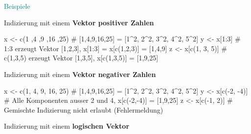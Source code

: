 \documentclass[
  8pt,
  ignorenonframetext,
]{beamer}
\newenvironment{Shaded}{\begin{snugshade}}{\end{snugshade}}
\newcommand{\CommentTok}[1]{\textcolor[rgb]{0.37,0.37,0.37}{#1}}
\newcommand{\DecValTok}[1]{\textcolor[rgb]{0.68,0.00,0.00}{#1}}
\newcommand{\FunctionTok}[1]{\textcolor[rgb]{0.28,0.35,0.67}{#1}}
\newcommand{\NormalTok}[1]{\textcolor[rgb]{0.00,0.23,0.31}{#1}}
\newcommand{\OtherTok}[1]{\textcolor[rgb]{0.00,0.23,0.31}{#1}}
\newcommand{\SpecialCharTok}[1]{\textcolor[rgb]{0.37,0.37,0.37}{#1}}
\begin{document}
\begin{frame}[fragile]{\textcolor{darkcyan}{Beispiele}}
\protect\hypertarget{section}{}
\footnotesize

Indizierung mit einem \textbf{Vektor positiver Zahlen}

\begin{Shaded}
\begin{Highlighting}[]
\NormalTok{x }\OtherTok{\textless{}{-}} \FunctionTok{c}\NormalTok{(}\DecValTok{1}\NormalTok{ ,}\DecValTok{4}\NormalTok{ ,}\DecValTok{9}\NormalTok{ ,}\DecValTok{16}\NormalTok{ ,}\DecValTok{25}\NormalTok{)   }\CommentTok{\# [1,4,9,16,25] = [1\^{}2, 2\^{}2, 3\^{}2, 4\^{}2, 5\^{}2]}
\NormalTok{y }\OtherTok{\textless{}{-}}\NormalTok{ x[}\DecValTok{1}\SpecialCharTok{:}\DecValTok{3}\NormalTok{]               }\CommentTok{\# 1:3 erzeugt Vektor [1,2,3], x[1:3] = x[c(1,2,3)] = [1,4,9]}
\NormalTok{z }\OtherTok{\textless{}{-}}\NormalTok{ x[}\FunctionTok{c}\NormalTok{(}\DecValTok{1}\NormalTok{, }\DecValTok{3}\NormalTok{, }\DecValTok{5}\NormalTok{)]        }\CommentTok{\# c(1,3,5) erzeugt Vektor [1,3,5], x[c(1,3,5)] = [1,9,25]}
\end{Highlighting}
\end{Shaded}

Indizierung mit einem \textbf{Vektor negativer Zahlen}

\begin{Shaded}
\begin{Highlighting}[]
\NormalTok{x }\OtherTok{\textless{}{-}} \FunctionTok{c}\NormalTok{(}\DecValTok{1}\NormalTok{, }\DecValTok{4}\NormalTok{, }\DecValTok{9}\NormalTok{, }\DecValTok{16}\NormalTok{, }\DecValTok{25}\NormalTok{)   }\CommentTok{\# [1,4,9,16,25] = [1\^{}2, 2\^{}2, 3\^{}2, 4\^{}2, 5\^{}2]}
\NormalTok{y }\OtherTok{\textless{}{-}}\NormalTok{ x[}\FunctionTok{c}\NormalTok{(}\SpecialCharTok{{-}}\DecValTok{2}\NormalTok{, }\SpecialCharTok{{-}}\DecValTok{4}\NormalTok{)]         }\CommentTok{\# Alle Komponenten ausser 2 und 4, x[c({-}2,{-}4)] = [1,9,25]}
\NormalTok{z }\OtherTok{\textless{}{-}}\NormalTok{ x[}\FunctionTok{c}\NormalTok{(}\SpecialCharTok{{-}}\DecValTok{1}\NormalTok{, }\DecValTok{2}\NormalTok{)]          }\CommentTok{\# Gemischte Indizierung nicht erlaubt (Fehlermeldung)}
\end{Highlighting}
\end{Shaded}

Indizierung mit einem \textbf{logischen Vektor}


\end{frame}
\end{document}
